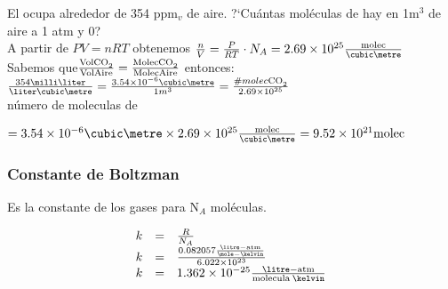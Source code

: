 \begin{example}%
 El  ocupa alrededor de 354 ppm$_v$ de aire. ?`Cu\'antas mol\'eculas de  hay en 1m$^3$ de aire a 1 atm y 0\celsius?\\
 A partir de $PV =nRT$  obtenemos $\frac{n}{V}=\frac{P}{RT}\cdot N_A=2.69\times10^{25} \frac{\textrm{molec}}{\cubic\metre}$\\
 Sabemos que$ \frac{\ce{Vol CO2}}{\ce{Vol Aire}}=\frac{\ce{Molec CO2}}{\ce{Molec Aire}}$ entonces:\\
\quad $\frac{354 \milli\liter}{\liter \cubic\metre}=\frac{3.54\times10^{-6}\cubic\metre}{1m^3}=\frac{\# molec \ce{CO2}}{2.69\times10^{25}}$\\
\quad n\'umero de moleculas de 

$=3.54\times10^{-6}\cubic\metre\times2.69\times10^{25}\frac{\textrm{molec}}{\cubic\metre} =9.52\times10^{21}\textrm{molec}$\\
\end{example}
 
\subsubsection{Constante de Boltzman}
Es la constante de los gases para N$_A$ mol\'eculas.

\[
\begin{array}{rcl}
k  &=&\frac{R}{N_A}  \\
k  &=&\frac{0.082057\frac{\litre-\mathrm{atm}}{\mole-\kelvin}}{6.022\times10^{23}}   \\    
k  &=&1.362\times10^{-25}\frac{\litre-\mathrm{atm}}{\mathrm{molecula}\: \kelvin}
\end{array}
\]

